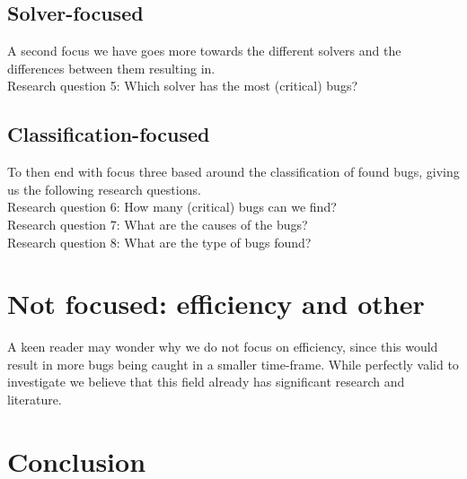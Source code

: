 \subsection{Solver-focused}
A second focus we have goes more towards the different solvers and the differences between them resulting in.
\\
Research question 5: Which solver has the most (critical) bugs?\\
\subsection{Classification-focused}
To then end with focus three based around the classification of found bugs, giving us the following research questions. 
\\
Research question 6: How many (critical) bugs can we find?\\
Research question 7: What are the causes of the bugs?\\
Research question 8: What are the type of bugs found?\\

\section{Not focused: efficiency and other} 
A keen reader may wonder why we do not focus on efficiency, since this would result in more bugs being caught in a smaller time-frame. While perfectly valid to investigate we believe that this field already has significant research and literature. 


\section{Conclusion}
\label{RQ:conclusion}

